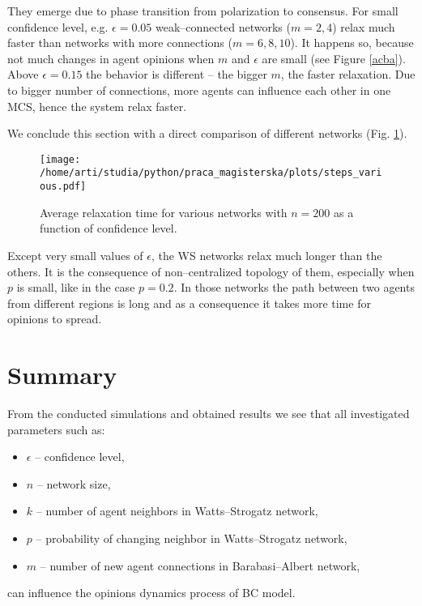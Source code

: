 \documentclass[a4paper, 12pt]{article}
\begin{document}
They emerge due to phase transition from polarization to consensus. 
For small confidence level, e.g. $\epsilon=0.05$ weak--connected networks ($m=2,4$) relax much faster than networks with more connections ($m=6,8,10$). It happens so, because not much changes in agent opinions when $m$ and $\epsilon$ are small (see Figure \ref{acba}). Above $\epsilon=0.15$ the behavior is different -- the bigger $m$, the faster relaxation. Due to bigger number of connections, more agents can influence each other in one MCS, hence the system relax faster. 

\indent

We conclude this section with a direct comparison of different networks (Fig. \ref{f35}).

\begin{figure}[H]
		\centering
		\texttt{[image: /home/arti/studia/python/praca\_magisterska/plots/steps\_various.pdf]}
		\caption{Average relaxation time for various networks with $n=200$ as a function of confidence level.}
		\label{f35}
\end{figure}

Except very small values of $\epsilon$, the WS networks relax much longer than the others. It is the consequence of non--centralized topology of them, especially when $p$ is small, like in the case $p=0.2$. In those networks the path between two agents from different regions is long and as a consequence it takes more time for opinions to spread.

\section{Summary}

From the conducted simulations and obtained results we see that all investigated parameters such as:
\begin{itemize}
\item $\epsilon$ -- confidence level,
\item $n$ -- network size,
\item $k$ -- number of agent neighbors in Watts--Strogatz network,
\item $p$ -- probability of changing neighbor in Watts--Strogatz network,
\item $m$ -- number of new agent connections in Barabasi--Albert network,
\end{itemize}
can influence the opinions dynamics process of BC model. 

\indent
\end{document}
